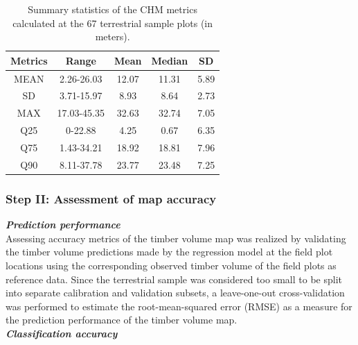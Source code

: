 
\begin{table}[H]
	\begin{center}
		\caption{Summary  statistics  of  the  CHM  metrics  calculated  at  the  67  terrestrial sample plots (in meters).}
		\vspace{0.2cm}
		\label{tab:sumCHMmetr}
		{\small %
			\begin{tabular}{|c|c|c|c|c|} %
				\hlineB{1}
				Metrics & Range & Mean & Median & SD \\
				\hline \hline
				MEAN & 2.26-26.03 & 12.07 & 11.31 & 5.89 \\
				SD & 3.71-15.97 & 8.93 & 8.64 & 2.73 \\
				MAX & 17.03-45.35 & 32.63 &	32.74 &	7.05 \\
				Q25	& 0-22.88 &	4.25 & 0.67 & 6.35 \\
				Q75	& 1.43-34.21 & 18.92 & 18.81 & 7.96 \\
				Q90	& 8.11-37.78 & 23.77 & 23.48 & 7.25 \\
				\hline \hline
			\end{tabular}
		}%
	\end{center}
\end{table}





\subsubsection{Step II: Assessment of map accuracy}
\label{sec:step2}

\textit{\textbf{Prediction performance}}\\

Assessing accuracy metrics of the timber volume map was realized by validating the timber volume predictions made by the regression model at the field plot locations using the corresponding observed timber volume of the field plots as reference data. Since the terrestrial sample was considered too small to be split into separate calibration and validation subsets, a leave-one-out cross-validation was performed to estimate the root-mean-squared error (RMSE) as a measure for the prediction performance of the timber volume map.\\

\textit{\textbf{Classification accuracy}}\\

